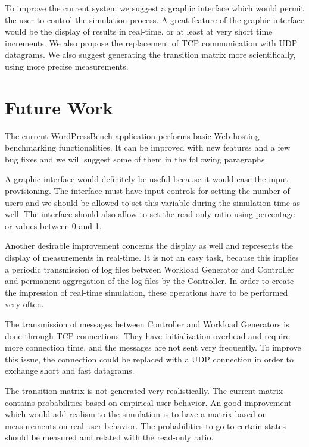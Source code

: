 To improve the current system we suggest a graphic interface which would permit the user to control the simulation process. A great feature of the graphic interface would be the display of results in real-time, or at least at very short time increments. We also propose the replacement of TCP communication with UDP datagrams. We also suggest generating the transition matrix more scientifically, using more precise measurements.


\section{Future Work}
\label{sec:future-work}

The current WordPressBench application performs basic Web-hosting benchmarking functionalities. It can be improved with new features and a few bug fixes and we will suggest some of them in the following paragraphs.

A graphic interface would definitely be useful because it would ease the input provisioning. The interface must have input controls for setting the number of users and we should be allowed to set this variable during the simulation time as well. The interface should also allow to set the read-only ratio using percentage or values between 0 and 1.

Another desirable improvement concerns the display as well and represents the display of measurements in real-time. It is not an easy task, because this implies a periodic transmission of log files between Workload Generator and Controller and permanent aggregation of the log files by the Controller. In order to create the impression of real-time simulation, these operations have to be performed very often.

The transmission of messages between Controller and Workload Generators is done through TCP connections. They have initialization overhead and require more connection time, and the messages are not sent very frequently. To improve this issue, the connection could be replaced with a UDP connection in order to exchange short and fast datagrams.

The transition matrix is not generated very realistically. The current matrix contains probabilities based on empirical user behavior. An good improvement which would add realism to the simulation is to have a matrix based on measurements on real user behavior. The probabilities to go to certain states should be measured and related with the read-only ratio.

